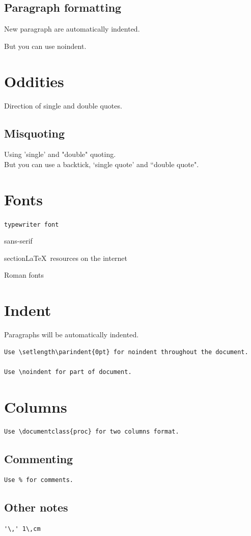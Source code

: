 \documentclass{article}
\begin{document}
\subsection{Paragraph formatting}

New paragraph are automatically indented.

\noindent But you can use noindent.

\section{Oddities}

Direction of single and double quotes.

\subsection{Misquoting}

Using 'single' and "double" quoting.
\\

\noindent But you can use a backtick, `single quote' and ``double quote".


\section{Fonts}

\texttt{typewriter font}

\textsf{sans-serif}

section{\textsf{\LaTeX\ resources on the internet}}

\textrm{Roman fonts}



\section{Indent}

Paragraphs will be automatically indented.

\begin{verbatim}
Use \setlength\parindent{0pt} for noindent throughout the document.

Use \noindent for part of document.

\end{verbatim}

\section{Columns}
\begin{verbatim}
Use \documentclass{proc} for two columns format.
\end{verbatim}

\subsection{Commenting}
\begin{verbatim}
Use % for comments.

\end{verbatim}

\subsection{Other notes}
\begin{verbatim}
'\,' 1\,cm
\end{verbatim}
\end{document}
